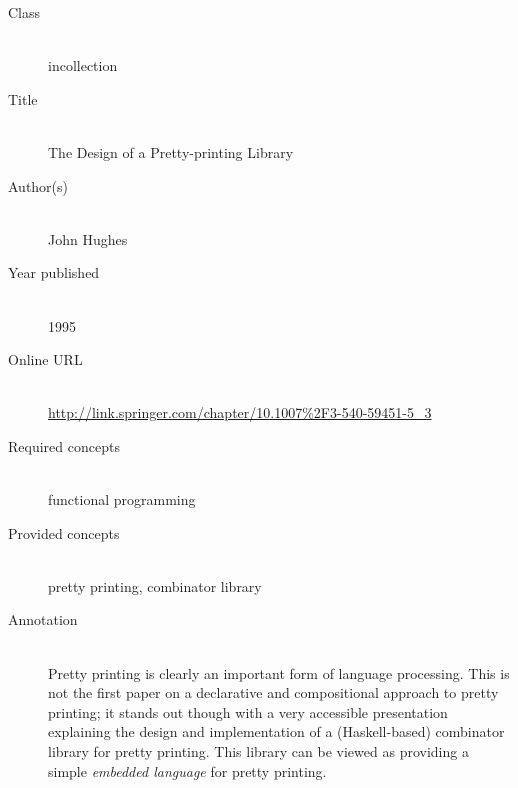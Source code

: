 \begin{description}
\item[Class]\mbox{}\\
incollection
\item[Title]\mbox{}\\
The Design of a Pretty-printing Library
\item[Author(s)]\mbox{}\\
John Hughes\item[Year published]\mbox{}\\
1995
\item[Online URL]\mbox{}\\
{\footnotesize\url{http://link.springer.com/chapter/10.1007%2F3-540-59451-5_3}}
\item[Required concepts]\mbox{}\\
functional programming\item[Provided concepts]\mbox{}\\
pretty printing, combinator library\item[Annotation]\mbox{}\\
Pretty printing is clearly an important form of language processing. This is not the first paper on a declarative and compositional approach to pretty printing; it stands out though with a very accessible presentation explaining the design and implementation of a (Haskell-based) combinator library for pretty printing. This library can be viewed as providing a simple \emph{embedded language} for pretty printing.
\end{description}

